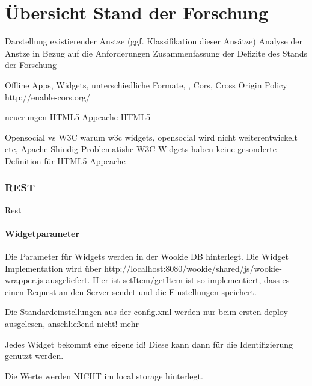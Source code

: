 \chapter{Übersicht Stand der Forschung} 
\label{Kapitel 4}
Darstellung existierender Anstze (ggf. Klassifikation dieser Ansätze)
Analyse der Anstze in Bezug auf die Anforderungen
Zusammenfassung der Defizite des Stands der Forschung

Offline Apps,
Widgets,
unterschiedliche Formate,
,
Cors,
Cross Origin Policy
http://enable-cors.org/

neuerungen HTML5
Appcache HTML5

Opensocial vs W3C
warum w3c widgets, opensocial wird nicht weiterentwickelt etc, Apache Shindig Problematishc
W3C Widgets haben keine gesonderte Definition für HTML5 Appcache

\subsection{REST}\label{section:rest}
Rest




\subsubsection{Widgetparameter}
Die Parameter für Widgets werden in der Wookie DB hinterlegt.
Die Widget Implementation wird über http://localhost:8080/wookie/shared/js/wookie-wrapper.js ausgeliefert.
Hier ist setItem/getItem ist so implementiert, dass es einen Request an den Server sendet und die Einstellungen speichert.

Die Standardeinstellungen aus der config.xml werden nur beim ersten deploy ausgelesen, anschließend nicht! mehr

Jedes Widget bekommt eine eigene id! Diese kann dann für die Identifizierung genutzt werden.

Die Werte werden NICHT im local storage hinterlegt.